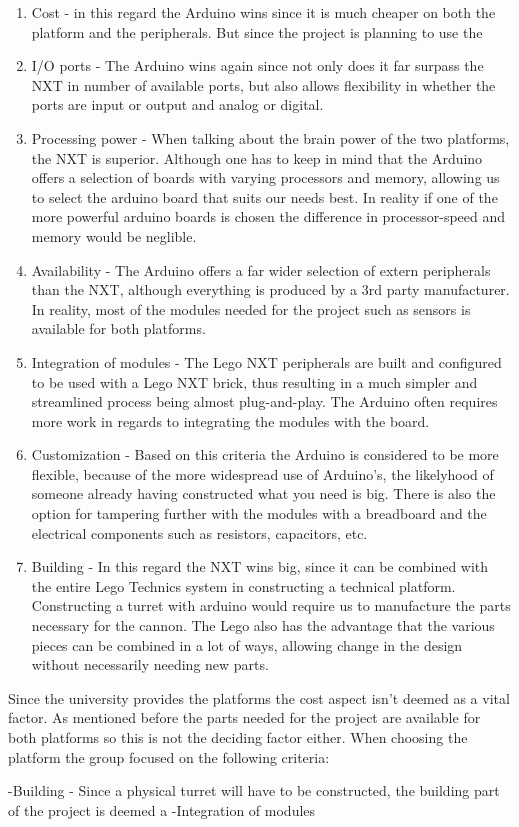 \begin{enumerate}
  \item Cost - in this regard the Arduino wins since it is much cheaper on both the platform and the peripherals. But since the project is planning to use
  the
  \item I/O ports - The Arduino wins again since not only does it far surpass the NXT in number of available ports,
  but also allows flexibility in whether the ports are input or output and analog or digital.
  \item Processing power - When talking about the brain power of the two platforms, the NXT is superior. Although one has to
  keep in mind that the Arduino offers a selection of boards with varying processors and memory, allowing us to select the arduino
  board that suits our needs best. In reality if one of the more powerful arduino boards is chosen the difference in processor-speed and memory
  would be neglible.
  \item Availability - The Arduino offers a far wider selection of extern peripherals than the NXT, although everything is produced by a 3rd party manufacturer.
  In reality, most of the modules needed for the project such as sensors is available for both platforms.
  \item Integration of modules - The Lego NXT peripherals are built and configured to be used with a Lego NXT brick, thus resulting in a much simpler
  and streamlined process being almost plug-and-play. The Arduino often requires more work in regards to integrating the modules with the board.
  \item Customization - Based on this criteria the Arduino is considered to be more flexible, because of the more widespread use of Arduino's, the likelyhood of someone
  already having constructed what you need is big. There is also the option for tampering further with the modules with a breadboard and the electrical components such as resistors, capacitors, etc.
  \item Building - In this regard the NXT wins big, since it can be combined with the entire Lego Technics system in constructing a technical platform. Constructing a turret with arduino would
  require us to manufacture the parts necessary for the cannon. The Lego also has the advantage that the various pieces can be combined in a lot of ways, allowing change in the design without necessarily needing new parts.
\end{enumerate}

Since the university provides the platforms the cost aspect isn't deemed as a vital factor. As mentioned before the parts needed for the project
are available for both platforms so this is not the deciding factor either. When choosing the platform the group focused on the following criteria:

-Building - Since a physical turret will have to be constructed, the building part of the project is deemed a 
-Integration of modules
